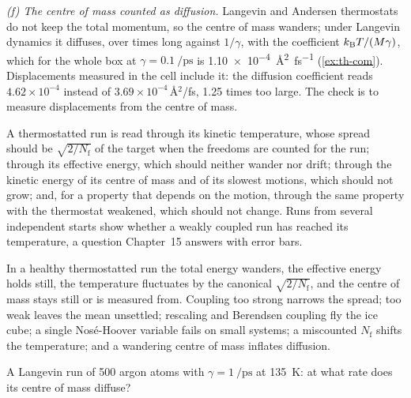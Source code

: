 \emph{(f) The centre of mass counted as diffusion.} Langevin and Andersen
thermostats do not keep the total momentum, so the centre of mass
wanders; under Langevin dynamics it diffuses, over times long against
$1/\gamma$, with the coefficient $k_{\mathrm{B}} T/(M\gamma)$, which for the whole
box at $\gamma = \SI{0.1}{\per\pico\second}$ is
\SI{1.10e-4}{\angstrom\squared\per\femto\second}
(\cref{ex:th-com}). Displacements measured in the cell include it: the
diffusion coefficient reads $4.62\times10^{-4}$ instead of
$3.69\times10^{-4}$\,\AA$^2$/fs, 1.25 times too large. The check is to measure displacements from the centre of mass.

\begin{practice}
A thermostatted run is read through its kinetic temperature, whose
spread should be $\sqrt{2/N_{\mathrm f}}$ of the target when the freedoms
are counted for the run; through its effective energy, which should
neither wander nor drift; through the kinetic energy of its centre of
mass and of its slowest motions, which should not grow; and, for a
property that depends on the motion, through the same property with the
thermostat weakened, which should not change. Runs from several
independent starts show whether a weakly coupled run has reached its
temperature, a question Chapter~15 answers with error bars.
\end{practice}

\begin{keyidea}
In a healthy thermostatted run the total energy wanders, the effective
energy holds still, the temperature fluctuates by the canonical
$\sqrt{2/N_{\mathrm f}}$, and the centre of mass stays still or is
measured from. Coupling too strong narrows the spread; too weak leaves the
mean unsettled; rescaling and Berendsen coupling fly the ice cube; a single Nosé-Hoover
variable fails on small systems; a miscounted $N_{\mathrm f}$ shifts the
temperature; and a wandering centre of mass inflates diffusion.
\end{keyidea}


\begin{selfcheck}
A Langevin run of 500 argon atoms with $\gamma = \SI{1}{\per\pico\second}$
at \SI{135}{\kelvin}: at what rate does its centre of mass diffuse?
\end{selfcheck}

